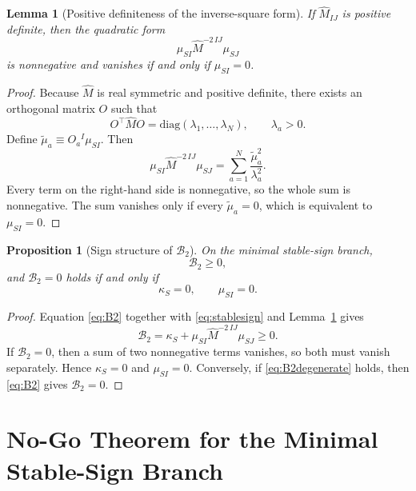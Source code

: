 \documentclass[11pt]{article}
\newtheorem{lemma}{Lemma}
\newtheorem{proposition}{Proposition}
\begin{document}
\begin{lemma}[Positive definiteness of the inverse-square form]
\label{lem:inverse-square}
If \(\widehat M_{IJ}\) is positive definite, then the quadratic form
\begin{equation}
\mu_{SI}\widehat M^{-2\,IJ}\mu_{SJ}
\label{eq:positiveform}
\end{equation}
is nonnegative and vanishes if and only if \(\mu_{SI}=0\).
\end{lemma}

\begin{proof}
Because \(\widehat M\) is real symmetric and positive definite, there exists an orthogonal matrix \(O\) such that
\[
O^\top \widehat M O = \mathrm{diag}(\lambda_1,\ldots,\lambda_N),
\qquad
\lambda_a>0.
\]
Define \(\widetilde\mu_a\equiv O_a{}^I\mu_{SI}\). Then
\begin{equation}
\mu_{SI}\widehat M^{-2\,IJ}\mu_{SJ}
=
\sum_{a=1}^N \frac{\widetilde\mu_a^2}{\lambda_a^2}.
\label{eq:diagform}
\end{equation}
Every term on the right-hand side is nonnegative, so the whole sum is nonnegative. The sum vanishes only if every \(\widetilde\mu_a=0\), which is equivalent to \(\mu_{SI}=0\).
\end{proof}

\begin{proposition}[Sign structure of \(\mathcal B_2\)]
\label{prop:B2-sign}
On the minimal stable-sign branch,
\begin{equation}
\mathcal B_2\ge 0,
\label{eq:B2positive}
\end{equation}
and \(\mathcal B_2=0\) holds if and only if
\begin{equation}
\kappa_S=0,
\qquad
\mu_{SI}=0.
\label{eq:B2degenerate}
\end{equation}
\end{proposition}

\begin{proof}
Equation \eqref{eq:B2} together with \eqref{eq:stablesign} and Lemma~\ref{lem:inverse-square} gives
\[
\mathcal B_2
=
\kappa_S+\mu_{SI}\widehat M^{-2\,IJ}\mu_{SJ}
\ge 0.
\]
If \(\mathcal B_2=0\), then a sum of two nonnegative terms vanishes, so both must vanish separately. Hence \(\kappa_S=0\) and \(\mu_{SI}=0\). Conversely, if \eqref{eq:B2degenerate} holds, then \eqref{eq:B2} gives \(\mathcal B_2=0\).
\end{proof}

\section{No-Go Theorem for the Minimal Stable-Sign Branch}
\end{document}
